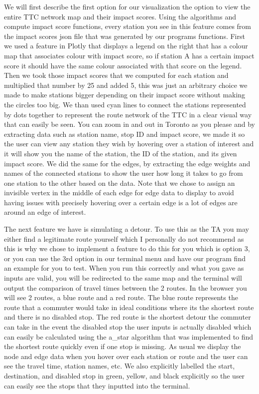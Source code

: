 \documentclass[fontsize=11pt]{article}
\begin{document}
\vspace{1em}

We will first describe the first option for our visualization the option to view the entire TTC network map and their impact scores. Using the algorithms and compute impact score functions, every station you see in this feature comes from the impact scores json file that was generated by our programs functions. First we used a feature in Plotly that displays a legend on the right that has a colour map that associates colour with impact score, so if station A has a certain impact score it should have the same colour associated with that score on the legend. Then we took those impact scores that we computed for each station and multiplied that number by 25 and added 5, this was just an arbitrary choice we made to make stations bigger depending on their impact score without making the circles too big. We than used cyan lines to connect the stations represented by dots together to represent the route network of the TTC in a clear visual way that can easily be seen. You can zoom in and out in Toronto as you please and by extracting data such as station name, stop ID and impact score, we made it so the user can view any station they wish by hovering over a station of interest and it will show you the name of the station, the ID of the station, and its given impact score. We did the same for the edges, by extracting the edge weights and names of the connected stations to show the user how long it takes to go from one station to the other based on the data. Note that we chose to assign an invisible vertex in the middle of each edge for edge data to display to avoid having issues with precisely hovering over a certain edge is a lot of edges are around an edge of interest.

\vspace{1em}

The next feature we have is simulating a detour. To use this as the TA you may either find a legitimate route yourself which I personally do not recommend as this is why we chose to implement a feature to do this for you which is option 3, or you can use the 3rd option in our terminal menu and have our program find an example for you to test. When you run this correctly and what you gave as inputs are valid, you will be redirected to the same map and the terminal will output the comparison of travel times between the 2 routes. In the browser you will see 2 routes, a blue route and a red route. The blue route represents the route that a commuter would take in ideal conditions where its the shortest route and there is no disabled stop. The red route is the shortest detour the commuter can take in the event the disabled stop the user inputs is actually disabled which can easily be calculated using the a\_star algorithm that was implemented to find the shortest route quickly even if one stop is missing. As usual we display the node and edge data when you hover over each station or route and the user can see the travel time, station names, etc. We also explicitly labelled the start, destination, and disabled stop in green, yellow, and black explicitly so the user can easily see the stops that they inputted into the terminal.
\end{document}
